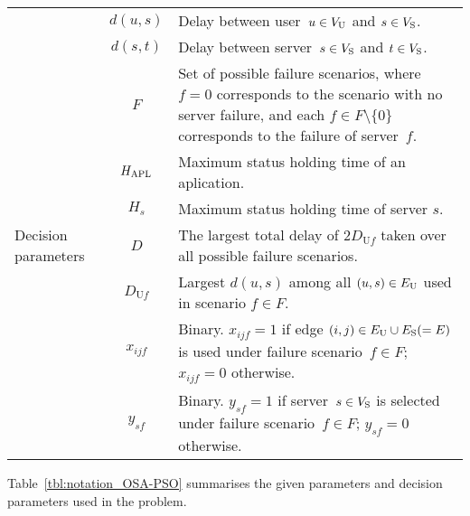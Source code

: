 \documentclass[10pt, letterpaper]{IEEEtran}
\begin{document}
\begin{CJK}{UTF8}{ipxm}
\begin{table}[tb]
\begin{tabular}{p{1.3cm}|cp{5.4cm}}
        & $d(u,s)$ & Delay between user~$u \in V_{\rm{U}}$ and $s \in V_{\rm{S}}$. \\
        & $d(s,t)$ & Delay between server~$s \in V_{\rm{S}}$ and $t \in V_{\rm{S}}$. \\ 
        & $F$ & Set of possible failure scenarios, where $f = 0$ corresponds to the scenario with no server failure, and each $f \in F \setminus \{0\}$ corresponds to the failure of server~$f$. \\
        & $H_{\rm APL}$ & Maximum status holding time of an aplication. \\
        & $H_s$ & Maximum status holding time of server $s$. \\ \hline
        Decision parameters & $D$ & The largest total delay of $2D_{\mathrm{U}f}$ taken over all possible failure scenarios. \\
        & $D_{\mathrm{U}f}$ & Largest $d(u,s)$ among all $(u,s) \in E_{\rm{U}}$ used in scenario $f \in F$. \\
        & $x_{ijf}$ & Binary. $x_{ijf} = 1$ if edge $(i,j) \in E_{\rm U} \cup E_{\rm S} (=E)$ is used under failure scenario~$f \in F$; $x_{ijf} = 0$ otherwise. \\
        & $y_{sf}$ & Binary. $y_{sf} = 1$ if server~$s \in V_{\rm{S}}$ is selected under failure scenario~$f \in F$; $y_{sf} = 0$ otherwise. \\ \hline
    \end{tabular}
\end{table}
Table~\ref{tbl:notation_OSA-PSO} summarises the given parameters and decision parameters used in the problem.


\end{CJK}
\end{document}
